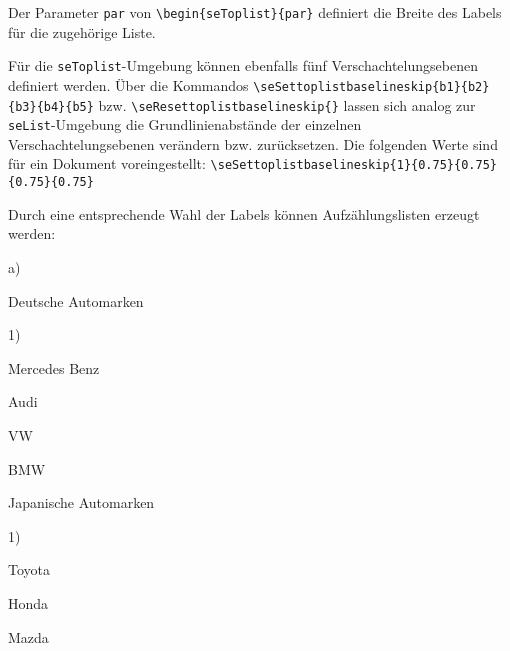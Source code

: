 \vspace*{-\baselineskip}
Der Parameter \verb+par+ von \verb+\begin{seToplist}{par}+ definiert die Breite des Labels f\"ur die 
zugeh\"orige Liste.

F\"ur die \verb+seToplist+-Umgebung k\"onnen ebenfalls f\"unf Verschachtelungsebenen definiert werden. 
\"Uber die Kommandos \newline
\hspace*{\fill}\verb+\seSettoplistbaselineskip{b1}{b2}{b3}{b4}{b5}+\hspace*{\fill}\newline 
bzw. \newline
\hspace*{\fill}\verb+\seResettoplistbaselineskip{}+\hspace*{\fill}\newline
lassen sich analog zur \verb+seList+-Umgebung die Grundlinienabst\"ande der einzelnen Verschachtelungsebenen 
ver\"andern bzw. zur\"ucksetzen. Die folgenden Werte sind f\"ur ein Dokument voreingestellt:\newline
\hspace*{\fill}\verb+\seSettoplistbaselineskip{1}{0.75}{0.75}{0.75}{0.75}+\hspace*{\fill}\newline\vspace*{-\baselineskip}

Durch eine entsprechende Wahl der Labels k\"onnen Aufz\"ahlungslisten erzeugt werden:

\begin{seToplist}{a)}
\item[a)] Deutsche Automarken
\begin{seToplist}{1)}
\item[1)] Mercedes Benz
\item[2)] Audi 
\item[3)] VW
\item[4)] BMW 
\end{seToplist}
\item[b)] Japanische Automarken
\begin{seToplist}{1)}
\item[1)] Toyota
\item[2)] Honda
\item[3)] Mazda
\end{seToplist}
\end{seToplist}




